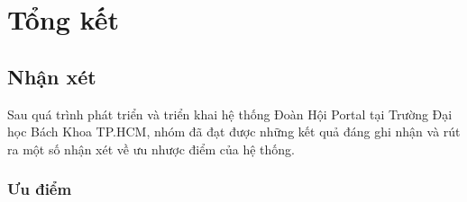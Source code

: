 \section{Tổng kết}

\subsection{Nhận xét}

Sau quá trình phát triển và triển khai hệ thống Đoàn Hội Portal tại Trường Đại học Bách Khoa TP.HCM, nhóm đã đạt được những kết quả đáng ghi nhận và rút ra một số nhận xét về ưu nhược điểm của hệ thống.

\subsubsection{Ưu điểm}

